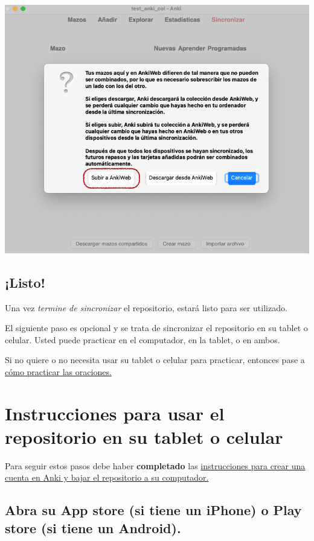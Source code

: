 \documentclass[
]{book}
\begin{document}
\includegraphics[width=1\linewidth]{images/reposit_sp/subir_a_anki}

\hypertarget{listo}{%
\section{¡Listo!}\label{listo}}

Una vez \emph{termine de sincronizar} el repositorio, estará listo para ser utilizado.

El siguiente paso es opcional y se trata de sincronizar el repositorio en su tablet o celular. Usted puede practicar en el computador, en la tablet, o en ambos.

Si no quiere o no necesita usar su tablet o celular para practicar, entonces pase a \protect\hyperlink{cross_4}{cómo practicar las oraciones.}

\hypertarget{instrucciones-para-usar-el-repositorio-en-su-tablet-o-celular}{%
\chapter{Instrucciones para usar el repositorio en su tablet o celular}\label{instrucciones-para-usar-el-repositorio-en-su-tablet-o-celular}}

Para seguir estos pasos debe haber \textbf{completado} las \protect\hyperlink{cross_0}{instrucciones para crear una cuenta en Anki y bajar el repositorio a su computador.}

\hypertarget{abra-su-app-store-si-tiene-un-iphone-o-play-store-si-tiene-un-android.}{%
\section{Abra su App store (si tiene un iPhone) o Play store (si tiene un Android).}\label{abra-su-app-store-si-tiene-un-iphone-o-play-store-si-tiene-un-android.}}
\end{document}
